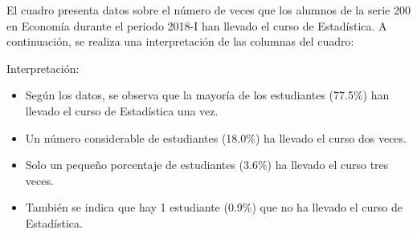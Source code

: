 \documentclass[
  jou,
  floatsintext,
  longtable,
  a4paper,
  nolmodern,
  notxfonts,
  notimes,
  12pt,
  colorlinks=true,linkcolor=blue,citecolor=blue,urlcolor=blue]{apa7}
\providecommand{\tightlist}{%
  \setlength{\itemsep}{0pt}\setlength{\parskip}{0pt}}
\begin{document}
El cuadro presenta datos sobre el número de veces que los alumnos de la
serie 200 en Economía durante el periodo 2018-I han llevado el curso de
Estadística. A continuación, se realiza una interpretación de las
columnas del cuadro:

Interpretación:

\begin{itemize}
\tightlist
\item
  Según los datos, se observa que la mayoría de los estudiantes (77.5\%)
  han llevado el curso de Estadística una vez.
\item
  Un número considerable de estudiantes (18.0\%) ha llevado el curso dos
  veces.
\item
  Solo un pequeño porcentaje de estudiantes (3.6\%) ha llevado el curso
  tres veces.
\item
  También se indica que hay 1 estudiante (0.9\%) que no ha llevado el
  curso de Estadística.
\end{itemize}
\end{document}
